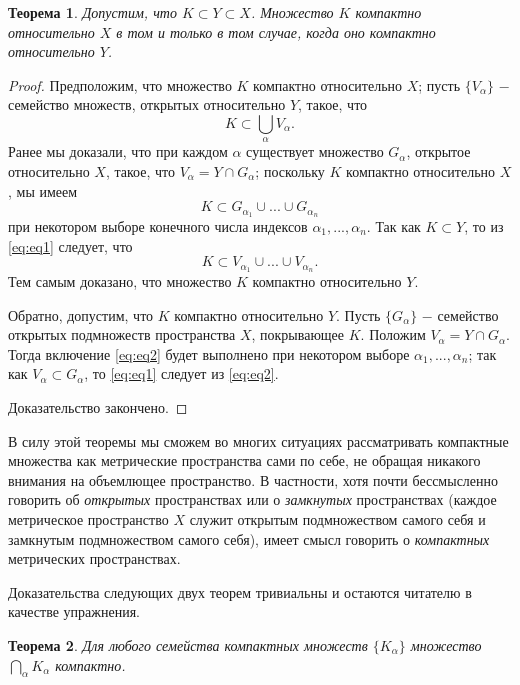 \documentclass{article}
\newtheorem{theorem}{Теорема}[section]
\begin{document}
\begin{theorem}
Допустим, что \(K \subset Y \subset X\). Множество \(K\) компактно относительно \(X\) в том и только в том случае, когда оно компактно относительно \(Y\).
\end{theorem}

\begin{proof}
Предположим, что множество \(K\) компактно относительно \(X\); пусть \(\{V_{\alpha}\}\) \(-\) семейство множеств, открытых относительно \(Y\), такое, что
\[
K \subset \bigcup\limits_{\alpha}V_\alpha.
\]
Ранее мы доказали, что при каждом \(\alpha\) существует множество \(G_\alpha\), открытое относительно \(X\), такое, что \(V_\alpha = Y \cap G_\alpha\); поскольку \(K\) компактно относительно \(X\), мы имеем
\[
K \subset G_{\alpha_1} \cup ... \cup G_{\alpha_n}  \tag{1} \label{eq:eq1}
\]
при некотором выборе конечного числа индексов \(\alpha_1, ..., \alpha_n\). Так как \(K \subset Y\), то из \eqref{eq:eq1} следует, что
\[
K \subset V_{\alpha_1} \cup ... \cup V_{\alpha_n}.  \tag{2} \label{eq:eq2}
\]
Тем самым доказано, что множество \(K\) компактно относительно \(Y\).

Обратно, допустим, что \(K\) компактно относительно \(Y\). Пусть \(\{G_{\alpha}\}\) \(-\) семейство открытых подмножеств пространства \(X\), покрывающее \(K\). Положим \(V_\alpha = Y \cap G_\alpha\). Тогда включение \eqref{eq:eq2} будет выполнено при некотором выборе \(\alpha_1, ..., \alpha_n\); так как \(V_\alpha \subset G_\alpha\), то \eqref{eq:eq1} следует из \eqref{eq:eq2}.

Доказательство закончено.
\end{proof}

В силу этой теоремы мы сможем во многих ситуациях рассматривать компактные множества как метрические пространства сами по себе, не обращая никакого внимания на объемлющее пространство. В частности, хотя почти бессмысленно говорить об \textit{открытых} пространствах или о \textit{замкнутых} пространствах (каждое метрическое пространство \(X\) служит открытым подмножеством самого себя и замкнутым подмножеством самого себя), имеет смысл говорить о \textit{компактных} метрических пространствах.

Доказательства следующих двух теорем тривиальны и остаются читателю в качестве упражнения.

\begin{theorem}
Для любого семейства компактных множеств \(\{K_{\alpha}\}\) множество \(\bigcap\limits_{\alpha}K_\alpha\) компактно.
\end{theorem}
\end{document}
